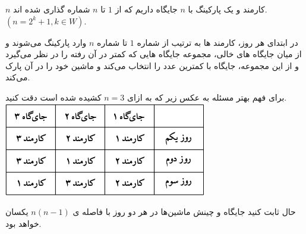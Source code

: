 \begin{PROBLEM}
	\p
	$n$
	کارمند و یک پارکینگ با 
	$n$
	جایگاه داریم که از 
	$1$
	تا 
	$n$
	شماره گذاری شده اند.
	$(n = 2^k + 1, k \in W)$.

	در ابتدای هر روز، کارمند ها به ترتیب از شماره 
	$1$
	تا شماره 
	$n$
	وارد پارکینگ می‌شوند و از میان جایگاه های خالی، مجموعه جایگاه هایی که کمتر در آن رفته را در نظر می‌گیرد و از 
	این مجموعه،‌ جایگاه با کمترین عدد را انتخاب می‌کند و ماشین خود را در آن پارک می‌کند.
	
	برای فهم بهتر مسئله به عکس زیر که به ازای 
	$n = 3$
	کشیده شده است دقت کنید.
	\includegraphics{21.png}

	حال ثابت کنید جایگاه و چینش ماشین‌ها در هر دو روز با فاصله ی 
	$n(n-1)$
	یکسان خواهد بود.

	\SOLUTION{
		\p

	}
\end{PROBLEM}